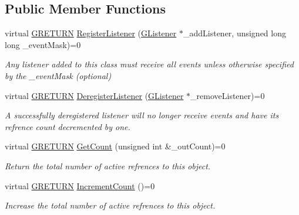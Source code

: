 \subsection*{Public Member Functions}
\begin{DoxyCompactItemize}
\item 
virtual \hyperlink{namespace_g_w_a69b1aaebac1cac8049825f035884c95b}{G\+R\+E\+T\+U\+RN} \hyperlink{class_g_w_1_1_c_o_r_e_1_1_g_broadcasting_a7411c69b20257c02791bccc92cb0fd2b}{Register\+Listener} (\hyperlink{class_g_w_1_1_c_o_r_e_1_1_g_listener}{G\+Listener} $\ast$\+\_\+add\+Listener, unsigned long long \+\_\+event\+Mask)=0
\begin{DoxyCompactList}\small\item\em Any listener added to this class must receive all events unless otherwise specified by the \+\_\+event\+Mask (optional) \end{DoxyCompactList}\item 
virtual \hyperlink{namespace_g_w_a69b1aaebac1cac8049825f035884c95b}{G\+R\+E\+T\+U\+RN} \hyperlink{class_g_w_1_1_c_o_r_e_1_1_g_broadcasting_a582f9f7b9311023dd1f00db49c16e80e}{Deregister\+Listener} (\hyperlink{class_g_w_1_1_c_o_r_e_1_1_g_listener}{G\+Listener} $\ast$\+\_\+remove\+Listener)=0
\begin{DoxyCompactList}\small\item\em A successfully deregistered listener will no longer receive events and have it\textquotesingle{}s refrence count decremented by one. \end{DoxyCompactList}\item 
virtual \hyperlink{namespace_g_w_a69b1aaebac1cac8049825f035884c95b}{G\+R\+E\+T\+U\+RN} \hyperlink{class_g_w_1_1_c_o_r_e_1_1_g_interface_a80f212dcdf60202cf9da49405863d1d5}{Get\+Count} (unsigned int \&\+\_\+out\+Count)=0
\begin{DoxyCompactList}\small\item\em Return the total number of active refrences to this object. \end{DoxyCompactList}\item 
virtual \hyperlink{namespace_g_w_a69b1aaebac1cac8049825f035884c95b}{G\+R\+E\+T\+U\+RN} \hyperlink{class_g_w_1_1_c_o_r_e_1_1_g_interface_a3e04e58eef4f3e3f56ff7fb751194c37}{Increment\+Count} ()=0
\begin{DoxyCompactList}\small\item\em Increase the total number of active refrences to this object. \end{DoxyCompactList}\item 

\end{DoxyCompactItemize}
